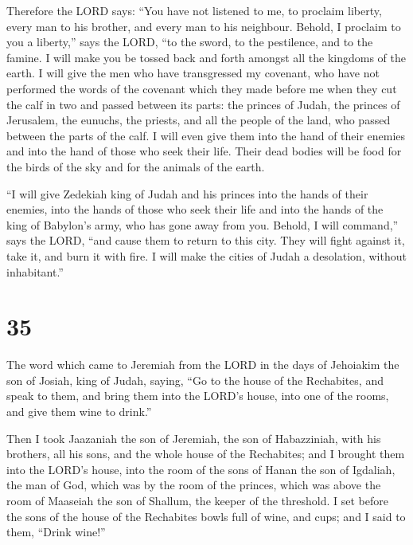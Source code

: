  Therefore the LORD says: ``You have not listened to me, to
proclaim liberty, every man to his brother, and every man to his
neighbour. Behold, I proclaim to you a liberty,'' says the LORD, ``to
the sword, to the pestilence, and to the famine. I will make you be
tossed back and forth amongst all the kingdoms of the earth.
 I will give the men who have transgressed my covenant, who
have not performed the words of the covenant which they made before me
when they cut the calf in two and passed between its parts:
 the princes of Judah, the princes of Jerusalem, the
eunuchs, the priests, and all the people of the land, who passed between
the parts of the calf.  I will even give them into the hand
of their enemies and into the hand of those who seek their life. Their
dead bodies will be food for the birds of the sky and for the animals of
the earth.

 ``I will give Zedekiah king of Judah and his princes into
the hands of their enemies, into the hands of those who seek their life
and into the hands of the king of Babylon's army, who has gone away from
you.  Behold, I will command,'' says the LORD, ``and cause
them to return to this city. They will fight against it, take it, and
burn it with fire. I will make the cities of Judah a desolation, without
inhabitant.''

\hypertarget{section-34}{%
\section{35}\label{section-34}}

 The word which came to Jeremiah from the LORD in the days
of Jehoiakim the son of Josiah, king of Judah, saying,  ``Go
to the house of the Rechabites, and speak to them, and bring them into
the LORD's house, into one of the rooms, and give them wine to drink.''

 Then I took Jaazaniah the son of Jeremiah, the son of
Habazziniah, with his brothers, all his sons, and the whole house of the
Rechabites;  and I brought them into the LORD's house, into
the room of the sons of Hanan the son of Igdaliah, the man of God, which
was by the room of the princes, which was above the room of Maaseiah the
son of Shallum, the keeper of the threshold.  I set before
the sons of the house of the Rechabites bowls full of wine, and cups;
and I said to them, ``Drink wine!''


